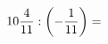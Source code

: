 \documentclass[preview]{standalone}
\begin{document}
\begin{align*}
10 { 4 \over 11 }  :  \left( - { 1 \over 11 } \right)  =
\end{align*}
\end{document}
